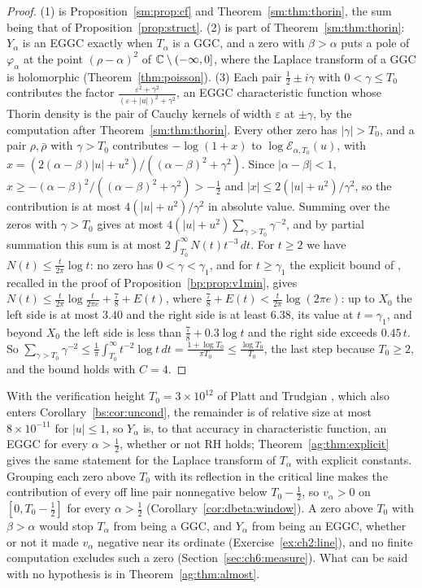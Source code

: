 \begin{proof}
(1) is Proposition~\ref{sm:prop:cf} and Theorem~\ref{sm:thm:thorin}, the sum being that of Proposition~\ref{prop:struct}. (2) is part of Theorem~\ref{sm:thm:thorin}: $Y_\alpha$ is an EGGC exactly when $T_\alpha$ is a GGC, and a zero with $\beta>\alpha$ puts a pole of $\varphi_\alpha$ at the point $(\rho-\alpha)^2$ of $\mathbb{C}\setminus(-\infty,0]$, where the Laplace transform of a GGC is holomorphic (Theorem~\ref{thm:poisson}). (3) Each pair $\frac12\pm i\gamma$ with $0<\gamma\le T_0$ contributes the factor $\frac{\varepsilon^2+\gamma^2}{(\varepsilon+|u|)^2+\gamma^2}$, an EGGC characteristic function whose Thorin density is the pair of Cauchy kernels of width $\varepsilon$ at $\pm\gamma$, by the computation after Theorem~\ref{sm:thm:thorin}. Every other zero has $|\gamma|>T_0$, and a pair $\rho,\bar\rho$ with $\gamma>T_0$ contributes $-\log(1+x)$ to $\log\mathcal E_{\alpha,T_0}(u)$, with $x=(2(\alpha-\beta)|u|+u^2)/((\alpha-\beta)^2+\gamma^2)$. Since $|\alpha-\beta|<1$, $x\ge-(\alpha-\beta)^2/((\alpha-\beta)^2+\gamma^2)>-\frac12$ and $|x|\le2(|u|+u^2)/\gamma^2$, so the contribution is at most $4(|u|+u^2)/\gamma^2$ in absolute value. Summing over the zeros with $\gamma>T_0$ gives at most $4(|u|+u^2)\sum_{\gamma>T_0}\gamma^{-2}$, and by partial summation this sum is at most $2\int_{T_0}^\infty N(t)t^{-3}\,dt$. For $t\ge2$ we have $N(t)\le\frac t{2\pi}\log t$: no zero has $0<\gamma<\gamma_1$, and for $t\ge\gamma_1$ the explicit bound of \cite{HSW22}, recalled in the proof of Proposition~\ref{bp:prop:v1min}, gives $N(t)\le\frac t{2\pi}\log\frac t{2\pi e}+\frac78+E(t)$, where $\frac78+E(t)<\frac t{2\pi}\log(2\pi e)$: up to $X_0$ the left side is at most $3.40$ and the right side is at least $6.38$, its value at $t=\gamma_1$, and beyond $X_0$ the left side is less than $\frac78+0.3\log t$ and the right side exceeds $0.45\,t$. So $\sum_{\gamma>T_0}\gamma^{-2}\le\frac1\pi\int_{T_0}^\infty t^{-2}\log t\,dt=\frac{1+\log T_0}{\pi T_0}\le\frac{\log T_0}{T_0}$, the last step because $T_0\ge2$, and the bound holds with $C=4$.
\end{proof}

With the verification height $T_0=3\times10^{12}$ of Platt and Trudgian \cite{PT21}, which also enters Corollary~\ref{bs:cor:uncond}, the remainder is of relative size at most $8\times10^{-11}$ for $|u|\le1$, so $Y_\alpha$ is, to that accuracy in characteristic function, an EGGC for every $\alpha>\frac12$, whether or not RH holds; Theorem~\ref{ag:thm:explicit} gives the same statement for the Laplace transform of $T_\alpha$ with explicit constants. Grouping each zero above $T_0$ with its reflection in the critical line makes the contribution of every off line pair nonnegative below $T_0-\frac12$, so $v_\alpha>0$ on $[0,T_0-\frac12]$ for every $\alpha>\frac12$ (Corollary~\ref{cor:dbeta:window}). A zero above $T_0$ with $\beta>\alpha$ would stop $T_\alpha$ from being a GGC, and $Y_\alpha$ from being an EGGC, whether or not it made $v_\alpha$ negative near its ordinate (Exercise~\ref{ex:ch2:line}), and no finite computation excludes such a zero (Section~\ref{sec:ch6:measure}). What can be said with no hypothesis is in Theorem~\ref{ag:thm:almost}.

